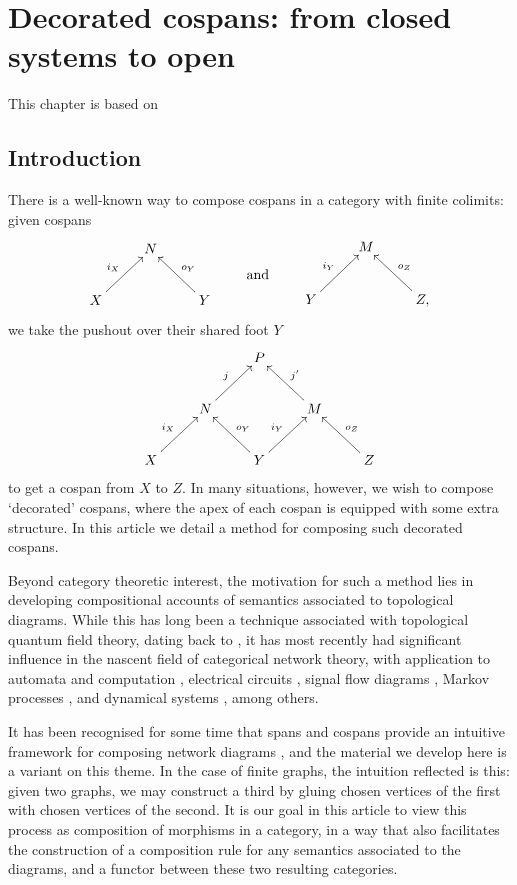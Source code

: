 \chapter{Decorated cospans: from closed systems to open}

This chapter is based on \cite{fong_decorated_2015}


\section{Introduction}

There is a well-known way to compose cospans in a category with finite colimits:
given cospans
\[
  \begin{aligned}
    \xymatrix{
      & N \\
      X \ar[ur]^{i_X} && Y \ar[ul]_{o_Y}
    }
  \end{aligned}
  \qquad \vcenter{\xymatrix{\mbox{and}}} \qquad
  \begin{aligned}
    \xymatrix{
      & M \\
      Y \ar[ur]^{i_Y} && Z, \ar[ul]_{o_Z}
    }
  \end{aligned}
\]
we take the pushout over their shared foot $Y$ 
\[
  \xymatrix{
    && P \\
    & N \ar[ur]^j && M \ar[ul]_{j'} \\
    X \ar[ur]^{i_X} && Y \ar[ul]_{o_Y} \ar[ur]^{i_Y} && Z \ar[ul]_{o_Z}
  }
\]
to get a cospan from $X$ to $Z$. In many situations, however, we wish to compose
`decorated' cospans, where the apex of each cospan is equipped with some extra
structure. In this article we detail a method for composing such decorated
cospans. 

Beyond category theoretic interest, the motivation for such a method lies in
developing compositional accounts of semantics associated to topological
diagrams. While this has long been a technique associated with topological
quantum field theory, dating back to \cite{At}, it has most recently had
significant influence in the nascent field of categorical network theory, with
application to automata and computation \cite{KSW2, Sp}, electrical circuits
\cite{BF}, signal flow diagrams \cite{BSZ, BE}, Markov processes \cite{BP,
ASW}, and dynamical systems \cite{VSL}, among others. 

It has been recognised for some time that spans and cospans provide an intuitive
framework for composing network diagrams \cite{KSW}, and the material we develop
here is a variant on this theme. In the case of finite graphs, the intuition
reflected is this: given two graphs, we may construct a third by gluing chosen
vertices of the first with chosen vertices of the second. It is our goal in this
article to view this process as composition of morphisms in a category, in a way
that also facilitates the construction of a composition rule for any semantics
associated to the diagrams, and a functor between these two resulting
categories.

